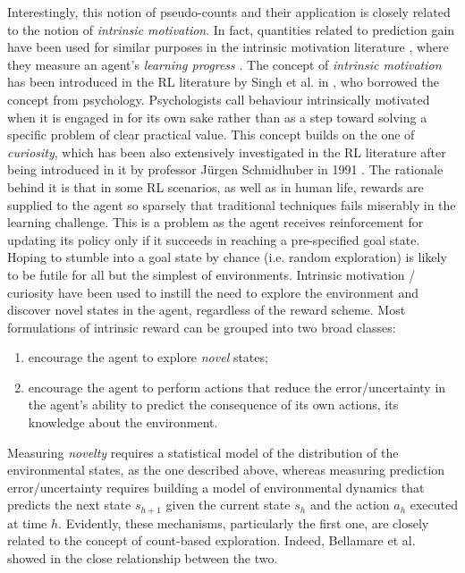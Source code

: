 Interestingly, this notion of pseudo-counts and their application is closely related to the notion of \emph{intrinsic motivation}. In fact, quantities related to prediction gain have been used for similar purposes in the intrinsic motivation literature \cite{lopes2012exploration}, where they measure an agent’s \emph{learning progress} \cite{oudeyer2007intrinsic}. The concept of \emph{intrinsic motivation} has been introduced in the \gls{RL} literature by Singh et al. in \cite{chentanez2005intrinsically}, who borrowed the concept from psychology. Psychologists call behaviour intrinsically motivated when it is engaged in for its own sake rather than as a step toward solving a specific problem of clear practical value. This concept builds on the one of \emph{curiosity}, which has been also extensively investigated in the \gls{RL} literature after being introduced in it by professor Jürgen Schmidhuber in 1991 \cite{schmidhuber1991possibility}. The rationale behind it is that in some \gls{RL} scenarios, as well as in human life, rewards are supplied to the agent so sparsely that traditional techniques fails miserably in the learning challenge. This is a problem as the agent receives reinforcement for updating its policy only if it succeeds in reaching a pre-specified goal state. Hoping to stumble into a goal state by chance (i.e. random exploration) is likely to be futile for all but the simplest of environments. Intrinsic motivation / curiosity have been used to instill the need to explore the environment and discover novel states in the agent, regardless of the reward scheme. Most formulations of intrinsic reward can be grouped into two broad classes:

\begin{enumerate}
\item encourage the agent to explore \emph{novel} states;
\item encourage the agent to perform actions that reduce the error/uncertainty in the agent’s ability to predict the consequence of its own actions, \ie its knowledge about the environment.
\end{enumerate}

Measuring \emph{novelty} requires a statistical model of the distribution of the environmental states, as the one described above, whereas measuring prediction error/uncertainty requires building a model of environmental dynamics that predicts the next state $s_{h+1}$ given the current state $s_h$ and the action $a_h$ executed at time $h$. Evidently, these mechanisms, particularly the first one, are closely related to the concept of count-based exploration. Indeed, Bellamare et al. showed in \cite{bellemare2016unifying} the close relationship between the two.\\

